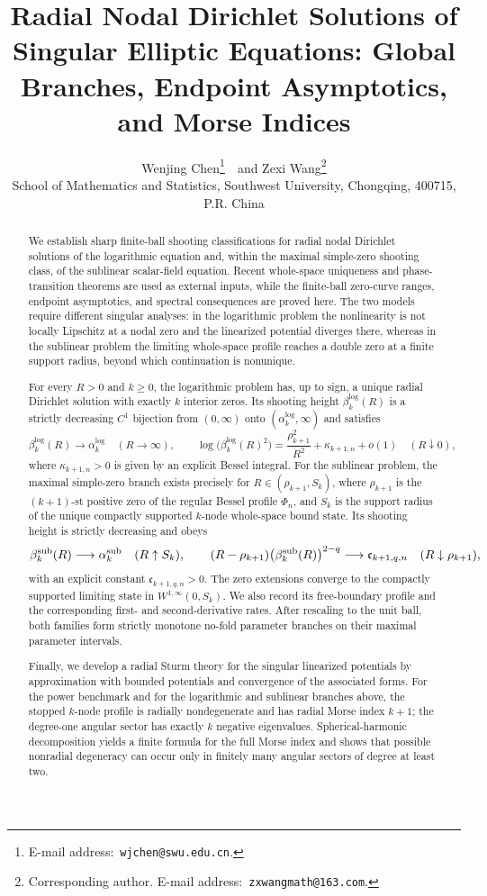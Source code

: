 \documentclass[11pt]{article}
\title{Radial Nodal Dirichlet Solutions of Singular Elliptic Equations: Global Branches, Endpoint Asymptotics, and Morse Indices}
\date{}
\author{Wenjing Chen\footnote{E-mail address:\, {\tt wjchen@swu.edu.cn}.}\  \ and Zexi Wang\footnote{Corresponding author. E-mail address:\, {\tt zxwangmath@163.com}.} \\
\footnotesize  School of Mathematics and Statistics, Southwest University,
Chongqing, 400715, P.R. China}
\begin{document}
\maketitle

\begin{abstract}
{We establish sharp finite-ball shooting classifications for radial nodal
Dirichlet solutions of the logarithmic equation and, within the maximal
simple-zero shooting class, of the sublinear scalar-field equation.  Recent
whole-space uniqueness and phase-transition theorems are used as external
inputs, while the finite-ball zero-curve ranges, endpoint asymptotics, and
spectral consequences are proved here.  The two models require different
singular analyses: in the logarithmic problem the nonlinearity is not locally
Lipschitz at a nodal zero and the linearized potential diverges there, whereas
in the sublinear problem the limiting whole-space profile reaches a double
zero at a finite support radius, beyond which continuation is nonunique.}

For every $R>0$ and $k\ge0$, the logarithmic problem has, up to sign, a unique
radial Dirichlet solution with exactly $k$ interior zeros. Its shooting
height $\beta_k^{\log}(R)$ is a strictly decreasing $C^1$ bijection from
$(0,\infty)$ onto $(\alpha_k^{\log},\infty)$ and satisfies
\[
 \beta_k^{\log}(R)\longrightarrow\alpha_k^{\log}
 \quad(R\to\infty),\qquad
 \log\bigl(\beta_k^{\log}(R)^2\bigr)
 =\frac{\rho_{k+1}^2}{R^2}+\kappa_{k+1,n}+o(1)
 \quad(R\downarrow0),
\]
{where $\kappa_{k+1,n}>0$ is given by an explicit Bessel integral.}
For the sublinear problem, the maximal simple-zero branch exists precisely for
$R\in(\rho_{k+1},S_k)$, where $\rho_{k+1}$ is the $(k+1)$-st positive zero of the regular Bessel profile $\Phi_n$, and $S_k$ is the support radius of the unique
compactly supported $k$-node whole-space bound state. Its shooting height is
strictly decreasing and obeys
\[
 \beta_k^{\rm sub}(R)\longrightarrow\alpha_k^{\rm sub}
 \quad(R\uparrow S_k),\qquad
 (R-\rho_{k+1})\bigl(\beta_k^{\rm sub}(R)\bigr)^{2-q}
 \longrightarrow \mathfrak c_{k+1,q,n}
 \quad(R\downarrow\rho_{k+1}),
\]
with an explicit constant $\mathfrak c_{k+1,q,n}>0$. {The zero extensions converge to the compactly supported limiting state in
$W^{1,\infty}(0,S_k)$.  We also record its free-boundary profile and the
corresponding first- and second-derivative rates.  After
rescaling to the unit ball, both families form strictly monotone no-fold
parameter branches on their maximal parameter intervals.}

{Finally, we develop a radial Sturm theory for the singular linearized
potentials by approximation with bounded potentials and convergence of the
associated forms.  For the power benchmark and for the logarithmic and
sublinear branches above, the stopped $k$-node profile is radially
nondegenerate and has radial Morse index $k+1$; the degree-one angular sector
has exactly $k$ negative eigenvalues.  Spherical-harmonic decomposition yields
a finite formula for the full Morse index and shows that possible nonradial
degeneracy can occur only in finitely many angular sectors of degree at least
two.}
\end{abstract}
\end{document}

